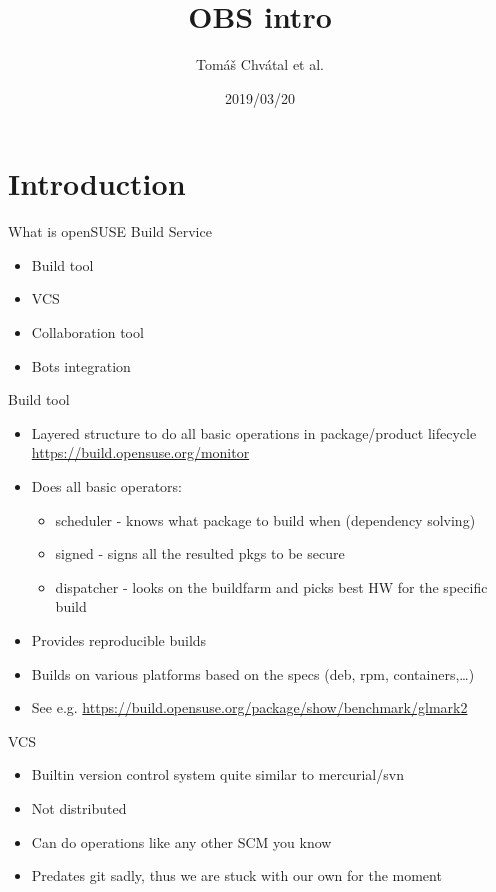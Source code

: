 \documentclass{beamer}
\author{Tom\'{a}\v{s} Chv\'{a}tal et al.\newline {\small tchvatal@suse.com}\newline {\small Packaging/L3 - Packaging}}
\title{OBS intro}
\date{2019/03/20}
\begin{document}
\begin{frame}[t,plain]
\titlepage
\end{frame}

\section{Introduction}

\begin{frame}[t]{What is openSUSE Build Service}
	\begin{itemize}
	\item Build tool
	\item VCS
	\item Collaboration tool
	\item Bots integration
    \end{itemize}
\end{frame}

\begin{frame}[t]{Build tool}
    \begin{itemize}
      \item Layered structure to do all basic operations in package/product lifecycle
        \url{https://build.opensuse.org/monitor}
      \item Does all basic operators:
	      \begin{itemize}
		      \item scheduler - knows what package to build when
			      (dependency solving)
		     \item signed - signs all the resulted pkgs to be secure
	             \item dispatcher - looks on the buildfarm and picks best
			     HW for the specific build
	      \end{itemize}
      \item Provides reproducible builds
      \item Builds on various platforms based on the specs (deb, rpm, containers,\ldots)
      \item See e.g. \url{https://build.opensuse.org/package/show/benchmark/glmark2}
    \end{itemize}
\end{frame}

\begin{frame}[t]{VCS}
    \begin{itemize}
      \item Builtin version control system quite similar to mercurial/svn
      \item Not distributed
      \item Can do operations like any other SCM you know
      \item Predates git sadly, thus we are stuck with our own for the moment
    \end{itemize}
\end{frame}
\end{document}
